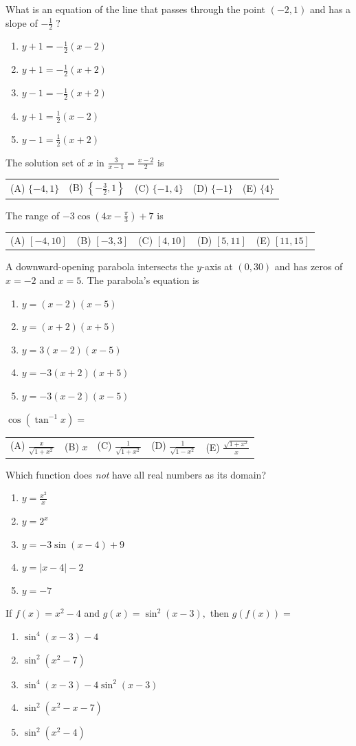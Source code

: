 \documentclass[letterstyle,12pt]{extarticle}
\newcounter{qcounter}
\newcommand{\choices}[5]{
\vspace{0.8em} 
\begin{enumerate}[label=(\Alph*)]
\setlength\itemsep{1em} 
\item
#1 
\item 
#2
\item
#3
\item
#4
\item
#5
\end{enumerate}
}
\newcommand{\choicesline}[5]{    
\vspace{2em} \break 
\begin{tabularx}{0.95 \textwidth} { 
>{\arraybackslash}X 
>{\arraybackslash}X 
>{\arraybackslash}X 
>{\arraybackslash}X 
>{\arraybackslash}X }
(A) \; #1
& 
(B) \; #2
& 
(C) \; #3
& 
(D) \; #4
&
(E) \; #5 
\end{tabularx}
\vspace{2em} \break
}
\newcommand{\ans}[1]{{\color{black} #1}}
\newenvironment{question}
    {\begin{minipage}{0.9 \textwidth}
        \item
    }
    { 
    \end{minipage} \vspace{4ex}
    }
\begin{document}
\begin{list}{\textbf{.}~}{}
\begin{question}
What is an equation of the line that passes through the point \((-2, 1)\) and has a slope of \(-\frac{1}{2} \; ?\)
\choices
{\(y + 1 = -\frac{1}{2}(x - 2)\)}
{\(y + 1 = -\frac{1}{2}(x + 2)\)}
{\ans{\(y - 1 = -\frac{1}{2}(x + 2)\)}}
{{\(y + 1 = \frac{1}{2}(x - 2)\)}}
{{\(y - 1 = \frac{1}{2}(x + 2)\)}}
\end{question}

\begin{question}
The solution set of \(x\) in \(\frac{3}{x - 1} = \frac{x - 2}{2}\) is \\
\choicesline
{\(\{-4, 1\}\)}
{\(\left\{-\frac{3}{2}, 1\right\}\)}
{\ans{\(\{-1, 4\}\)}}
{\(\{-1\}\)}
{\(\{4\}\)}
\end{question}

\begin{question}
The range of \(-3 \cos \left(4x - \frac{\pi}{3}\right) + 7\) is \\
\choicesline
{\([-4, 10]\)}
{\([-3, 3]\)}
{\ans{\([4, 10]\)}}
{\([5, 11]\)}
{\([11, 15]\)}
\end{question}

\begin{question}
A downward-opening parabola intersects the \(y\)-axis at \((0, 30)\) and has zeros of \(x = -2\) and \(x = 5.\) The parabola's equation is 
\choices
{\(y = (x - 2)(x - 5)\)}
{\(y = (x + 2)(x + 5)\)}
{\(y = 3(x - 2)(x - 5)\)}
{\(y = -3(x + 2)(x + 5)\)}
{\ans{\(y = -3(x - 2)(x - 5)\)}}
\end{question}

\begin{question}
\(\cos \left(\tan^{-1} x\right) =\) \\
\choicesline
{\(\frac{x}{\sqrt{1 + x^2}}\)}
{\(x\)}
{\ans{\(\frac{1}{\sqrt{1 + x^2}}\)}}
{\(\frac{1}{\sqrt{1 - x^2}}\)}
{\(\frac{\sqrt{1 + x^2}}{x}\)}
\end{question}

\begin{question}
Which function does \emph{not} have all real  numbers as its domain?
\choices
{\ans{\(y = \frac{x^2}{x}\)}}
{\(y = 2^x\)}
{\(y = -3 \sin(x - 4) + 9\)}
{\(y = |x - 4| - 2\)}
{\(y = -7\)}
\end{question}

\begin{question}
If \(f(x) = x^2 - 4\) and \(g(x) = \sin^2(x - 3),\) then \(g(f(x)) =\) \\ 
\choices
{\(\sin^4(x - 3) - 4\)}
{\ans{\(\sin^2(x^2 - 7)\)}}
{\(\sin^4(x - 3) - 4 \sin^2(x - 3)\)}
{\(\sin^2(x^2 - x - 7)\)}
{\(\sin^2(x^2 - 4)\)}
\end{question}


\end{list}
\end{document}
